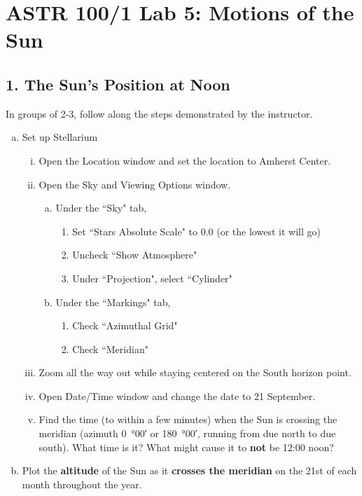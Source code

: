 \documentclass[main.tex]{subfiles}
\begin{document}
\section*{ASTR 100/1 Lab 5: Motions of the Sun}
\subsection*{1. The Sun's Position at Noon}
In groups of 2-3, follow along the steps demonstrated by the instructor.
\begin{enumerate}[a.]
\item Set up Stellarium
	\begin{enumerate}[i.]
	\item Open the Location window and set the location to Amherst Center.
	\item Open the Sky and Viewing Options window.
		\begin{enumerate}[a)]
		\item Under the ``Sky" tab,
			\begin{enumerate}[1)]
			\item Set ``Stars Absolute Scale" to 0.0 (or the lowest it will go)
			\item Uncheck ``Show Atmosphere"
			\item Under ``Projection", select ``Cylinder"
			\end{enumerate}
		\item Under the ``Markings" tab,
			\begin{enumerate}[1)]
			\item Check ``Azimuthal Grid"
			\item Check ``Meridian"
			\end{enumerate}
		\end{enumerate}
	\item Zoom all the way out while staying centered on the South horizon point.
	\item Open Date/Time window and change the date to 21 September.
	\item Find the time (to within a few minutes) when the Sun is crossing the meridian (azimuth \SI{0}{\degree}00\si{\arcminute} or \SI{180}{\degree}00\si{\arcminute}, running from due north to due south). What time is it? What might cause it to \textbf{not} be 12:00 noon?
	\end{enumerate}

\item Plot the \textbf{altitude} of the Sun as it \textbf{crosses the meridian} on the 21st of each month throughout the year.
\end{enumerate}
\end{document}
